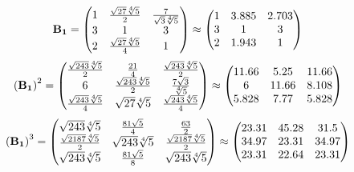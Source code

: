\documentclass[10pt,a4paper]{article}
\begin{document}
	\[
		\bold{B_1} = 
		\begin{pmatrix}
			{1} {} & \frac{\sqrt{27}\sqrt[4]{5}} {{2}} & \frac{{7}} {\sqrt{3}\sqrt[4]{5}} \\
			{{3}} {} & {1} {} & {{3}} {} \\
			{{2}} {} & \frac{\sqrt{27}\sqrt[4]{5}} {{4}} & {1} {} \\
		\end{pmatrix}
		\approx
		\begin{pmatrix}
			1        & 3.885    & 2.703    \\
			3        & 1        & 3        \\
			2        & 1.943    & 1        \\
		\end{pmatrix}
	\]
	\[
		\left(\bold{B_1}\right)^{2} = 
		\begin{pmatrix}
			\frac{\sqrt{243}\sqrt[4]{5}} {{2}} & \frac{{21}} {{4}} & \frac{\sqrt{243}\sqrt[4]{5}} {{2}} \\
			{{6}} {} & \frac{\sqrt{243}\sqrt[4]{5}} {{2}} & \frac{{7}\sqrt{3}} {\sqrt[4]{5}} \\
			\frac{\sqrt{243}\sqrt[4]{5}} {{4}} & {\sqrt{27}\sqrt[4]{5}} {} & \frac{\sqrt{243}\sqrt[4]{5}} {{4}} \\
		\end{pmatrix}
		\approx
		\begin{pmatrix}
			11.66    & 5.25     & 11.66    \\
			6        & 11.66    & 8.108    \\
			5.828    & 7.77     & 5.828    \\
		\end{pmatrix}
	\]
	\[
		\left(\bold{B_1}\right)^{3} = 
		\begin{pmatrix}
			{\sqrt{243}\sqrt[4]{5}} {} & \frac{{81}\sqrt{5}} {{4}} & \frac{{63}} {{2}} \\
			\frac{\sqrt{2187}\sqrt[4]{5}} {{2}} & {\sqrt{243}\sqrt[4]{5}} {} & \frac{\sqrt{2187}\sqrt[4]{5}} {{2}} \\
			{\sqrt{243}\sqrt[4]{5}} {} & \frac{{81}\sqrt{5}} {{8}} & {\sqrt{243}\sqrt[4]{5}} {} \\
		\end{pmatrix}
		\approx
		\begin{pmatrix}
			23.31    & 45.28    & 31.5     \\
			34.97    & 23.31    & 34.97    \\
			23.31    & 22.64    & 23.31    \\
		\end{pmatrix}
	\]
\end{document}
